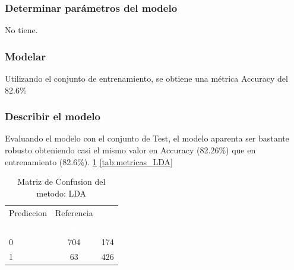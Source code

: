 \subsubsection{Determinar parámetros del modelo}

No tiene.


\subsubsection{Modelar}

Utilizando el conjunto de entrenamiento, se obtiene una métrica Accuracy del 82.6\%


\subsubsection{Describir el modelo}

Evaluando el modelo con el conjunto de Test, el modelo aparenta ser
bastante robusto obteniendo casi el mismo valor en Accuracy (82.26\%)
que en entrenamiento (82.6\%). \ref{tab:MatrizConf_LDA} \ref{tab:metricas_LDA}

\begin{table}[!h]
	
	\caption{\label{tab:MatrizConf_LDA}Matriz de Confusion del metodo: LDA }
	\centering
	\begin{tabular}[t]{lcc}
		\toprule
		\multicolumn{1}{c}{Prediccion} & \multicolumn{1}{c}{Referencia} & \multicolumn{1}{c}{ } \\
		\cmidrule(l{3pt}r{3pt}){1-1} \cmidrule(l{3pt}r{3pt}){2-2}
		\rowcolor{black}  \multicolumn{1}{c}{\textcolor{white}{\textbf{ }}} & \multicolumn{1}{c}{\textcolor{white}{\textbf{0}}} & \multicolumn{1}{c}{\textcolor{white}{\textbf{1}}}\\
		\midrule
		\rowcolor{gray!6}  0 & 704 & 174\\
		1 & 63 & 426\\
		\bottomrule
	\end{tabular}
\end{table}

